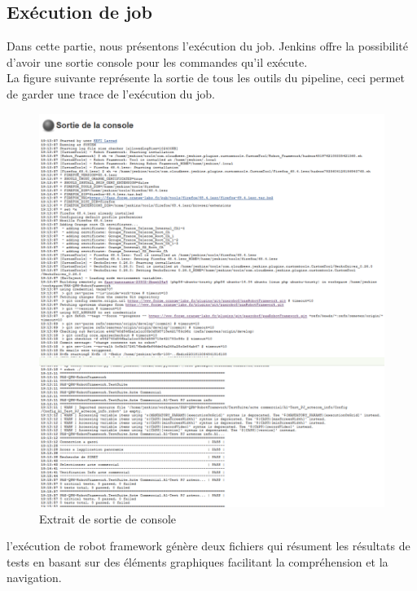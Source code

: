 \subsection{Exécution de job}
Dans cette partie, nous présentons l’exécution du job. Jenkins offre la possibilité d’avoir une sortie console pour les commandes qu’il exécute.\\
La figure suivante représente la sortie de tous les outils du pipeline, ceci permet de garder une trace de l’exécution du job.
\begin{figure}[H]
	\centering
	\includegraphics[width=1\linewidth]{"img/jenkins/exemple console"}
	\caption[Extrait de sortie de console]{Extrait de sortie de console}
	\label{fig:exemple-console}
\end{figure}
l’exécution de robot framework génère deux fichiers qui résument les résultats de tests en basant sur des éléments graphiques facilitant la compréhension et la navigation.
